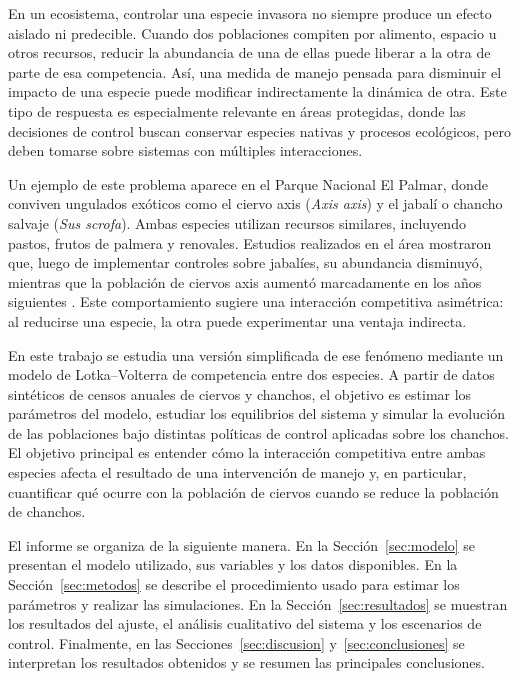 \documentclass[11pt,a4paper]{article}
\newif\ifguias
\newcommand{\guia}[1]{\ifguias\par\noindent
  {\color{gray!85!black}\small\itshape #1}\par\medskip\fi}
\begin{document}

En un ecosistema, controlar una especie invasora no siempre produce un efecto aislado ni predecible. Cuando dos poblaciones compiten por alimento, espacio u otros recursos, reducir la abundancia de una de ellas puede liberar a la otra de parte de esa competencia. Así, una medida de manejo pensada para disminuir el impacto de una especie puede modificar indirectamente la dinámica de otra. Este tipo de respuesta es especialmente relevante en áreas protegidas, donde las decisiones de control buscan conservar especies nativas y procesos ecológicos, pero deben tomarse sobre sistemas con múltiples interacciones.

Un ejemplo de este problema aparece en el Parque Nacional El Palmar, donde conviven ungulados exóticos como el ciervo axis (\emph{Axis axis}) y el jabalí o chancho salvaje (\emph{Sus scrofa}). Ambas especies utilizan recursos similares, incluyendo pastos, frutos de palmera y renovales. Estudios realizados en el área mostraron que, luego de implementar controles sobre jabalíes, su abundancia disminuyó, mientras que la población de ciervos axis aumentó marcadamente en los años siguientes \cite{gurtler2018}. Este comportamiento sugiere una interacción competitiva asimétrica: al reducirse una especie, la otra puede experimentar una ventaja indirecta.

En este trabajo se estudia una versión simplificada de ese fenómeno mediante un modelo de Lotka--Volterra de competencia entre dos especies. A partir de datos sintéticos de censos anuales de ciervos y chanchos, el objetivo es estimar los parámetros del modelo, estudiar los equilibrios del sistema y simular la evolución de las poblaciones bajo distintas políticas de control aplicadas sobre los chanchos. El objetivo principal es entender cómo la interacción competitiva entre ambas especies afecta el resultado de una intervención de manejo y, en particular, cuantificar qué ocurre con la población de ciervos cuando se reduce la población de chanchos.

El informe se organiza de la siguiente manera. En la Sección~\ref{sec:modelo} se presentan el modelo utilizado, sus variables y los datos disponibles. En la Sección~\ref{sec:metodos} se describe el procedimiento usado para estimar los parámetros y realizar las simulaciones. En la Sección~\ref{sec:resultados} se muestran los resultados del ajuste, el análisis cualitativo del sistema y los escenarios de control. Finalmente, en las Secciones~\ref{sec:discusion} y~\ref{sec:conclusiones} se interpretan los resultados obtenidos y se resumen las principales conclusiones.
\end{document}
